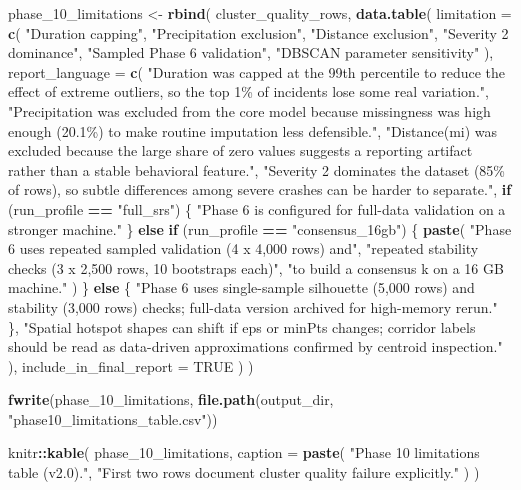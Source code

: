 \documentclass[
]{article}
\newenvironment{Shaded}{\begin{snugshade}}{\end{snugshade}}
\newcommand{\AttributeTok}[1]{\textcolor[rgb]{0.13,0.29,0.53}{#1}}
\newcommand{\ConstantTok}[1]{\textcolor[rgb]{0.56,0.35,0.01}{#1}}
\newcommand{\ControlFlowTok}[1]{\textcolor[rgb]{0.13,0.29,0.53}{\textbf{#1}}}
\newcommand{\FunctionTok}[1]{\textcolor[rgb]{0.13,0.29,0.53}{\textbf{#1}}}
\newcommand{\NormalTok}[1]{#1}
\newcommand{\OtherTok}[1]{\textcolor[rgb]{0.56,0.35,0.01}{#1}}
\newcommand{\SpecialCharTok}[1]{\textcolor[rgb]{0.81,0.36,0.00}{\textbf{#1}}}
\newcommand{\StringTok}[1]{\textcolor[rgb]{0.31,0.60,0.02}{#1}}
\begin{document}
\begin{Shaded}
\begin{Highlighting}[]
\NormalTok{phase\_10\_limitations }\OtherTok{\textless{}{-}} \FunctionTok{rbind}\NormalTok{(}
\NormalTok{  cluster\_quality\_rows,}
  \FunctionTok{data.table}\NormalTok{(}
    \AttributeTok{limitation =} \FunctionTok{c}\NormalTok{(}
      \StringTok{"Duration capping"}\NormalTok{,}
      \StringTok{"Precipitation exclusion"}\NormalTok{,}
      \StringTok{"Distance exclusion"}\NormalTok{,}
      \StringTok{"Severity 2 dominance"}\NormalTok{,}
      \StringTok{"Sampled Phase 6 validation"}\NormalTok{,}
      \StringTok{"DBSCAN parameter sensitivity"}
\NormalTok{    ),}
    \AttributeTok{report\_language =} \FunctionTok{c}\NormalTok{(}
      \StringTok{"Duration was capped at the 99th percentile to reduce the effect of extreme outliers, so the top 1\% of incidents lose some real variation."}\NormalTok{,}
      \StringTok{"Precipitation was excluded from the core model because missingness was high enough (20.1\%) to make routine imputation less defensible."}\NormalTok{,}
      \StringTok{"Distance(mi) was excluded because the large share of zero values suggests a reporting artifact rather than a stable behavioral feature."}\NormalTok{,}
      \StringTok{"Severity 2 dominates the dataset (85\% of rows), so subtle differences among severe crashes can be harder to separate."}\NormalTok{,}
      \ControlFlowTok{if}\NormalTok{ (run\_profile }\SpecialCharTok{==} \StringTok{"full\_srs"}\NormalTok{) \{}
        \StringTok{"Phase 6 is configured for full{-}data validation on a stronger machine."}
\NormalTok{      \} }\ControlFlowTok{else} \ControlFlowTok{if}\NormalTok{ (run\_profile }\SpecialCharTok{==} \StringTok{"consensus\_16gb"}\NormalTok{) \{}
        \FunctionTok{paste}\NormalTok{(}
          \StringTok{"Phase 6 uses repeated sampled validation (4 x 4,000 rows) and"}\NormalTok{,}
          \StringTok{"repeated stability checks (3 x 2,500 rows, 10 bootstraps each)"}\NormalTok{,}
          \StringTok{"to build a consensus k on a 16 GB machine."}
\NormalTok{        )}
\NormalTok{      \} }\ControlFlowTok{else}\NormalTok{ \{}
        \StringTok{"Phase 6 uses single{-}sample silhouette (5,000 rows) and stability (3,000 rows) checks; full{-}data version archived for high{-}memory rerun."}
\NormalTok{      \},}
      \StringTok{"Spatial hotspot shapes can shift if eps or minPts changes; corridor labels should be read as data{-}driven approximations confirmed by centroid inspection."}
\NormalTok{    ),}
    \AttributeTok{include\_in\_final\_report =} \ConstantTok{TRUE}
\NormalTok{  )}
\NormalTok{)}

\FunctionTok{fwrite}\NormalTok{(phase\_10\_limitations, }\FunctionTok{file.path}\NormalTok{(output\_dir, }\StringTok{"phase10\_limitations\_table.csv"}\NormalTok{))}

\NormalTok{knitr}\SpecialCharTok{::}\FunctionTok{kable}\NormalTok{(}
\NormalTok{  phase\_10\_limitations,}
  \AttributeTok{caption =} \FunctionTok{paste}\NormalTok{(}
    \StringTok{"Phase 10 limitations table (v2.0)."}\NormalTok{,}
    \StringTok{"First two rows document cluster quality failure explicitly."}
\NormalTok{  )}
\NormalTok{)}
\end{Highlighting}
\end{Shaded}
\end{document}
